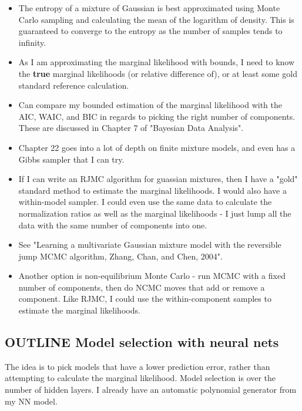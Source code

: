 \documentclass[10pt,a4paper]{article}
\begin{document}
\begin{itemize}
\item The entropy of a mixture of Gaussian is best approximated using Monte Carlo sampling and calculating the mean of the logarithm of density. This is guaranteed to converge to the entropy as the number of samples tends to infinity.
\item As I am approximating the marginal likelihood with bounds, I need to know the \textbf{true} marginal likelihoods (or relative difference of), or at least some gold standard reference calculation.
\item Can compare my bounded estimation of the marginal likelihood with the AIC, WAIC, and BIC in regards to picking the right number of components. These are discussed in Chapter 7 of "Bayesian Data Analysis".
\item Chapter 22 goes into a lot of depth on finite mixture models, and even has a Gibbs sampler that I can try.
\item If I can write an RJMC algorithm for guassian mixtures, then I have a "gold" standard method to estimate the marginal likelihoods. I would also have a within-model sampler. I could even use the same data to calculate the normalization ratios as well as the marginal likelihoods - I just lump all the data with the same number of components into one. 
\item See "Learning a multivariate Gaussian mixture model with the reversible jump MCMC algorithm, Zhang, Chan, and Chen, 2004".
\item Another option is non-equilibrium Monte Carlo - run MCMC with a fixed number of components, then do NCMC moves that add or remove a component. Like RJMC, I could use the within-component samples to estimate the marginal likelihoods.
\end{itemize}

\subsection{OUTLINE Model selection with neural nets}
The idea is to pick models that have a lower prediction error, rather than attempting to calculate the marginal likelihood. Model selection is over the number of hidden layers. I already have an automatic polynomial generator from my NN model.
\end{document}
